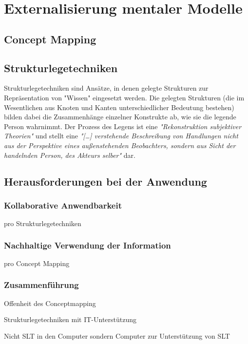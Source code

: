 \chapter{Externalisierung mentaler Modelle} %
\label{cha:externalisierung}



\section{Concept Mapping} %
\label{sec:concept_mapping}


\section{Strukturlegetechniken} %
\label{sec:strukturlegetechniken}

Strukturlegetechniken sind Ansätze, in denen gelegte Strukturen zur Repräsentation von "Wissen" eingesetzt werden. Die gelegten Strukturen (die im Wesentlichen aus Knoten und Kanten unterschiedlicher Bedeutung bestehen) bilden dabei die Zusammenhänge einzelner Konstrukte ab, wie sie die legende Person wahrnimmt. Der Prozess des Legens ist eine \emph{"Rekonstruktion subjektiver Theorien"} \citep{Dann92} und stellt eine \emph{"[\ldots] verstehende Beschreibung von Handlungen nicht aus der Perspektive eines außenstehenden Beobachters, sondern aus Sicht der handelnden Person, des Akteurs selber"} \citep{Dann92} dar. 


\section{Herausforderungen bei der Anwendung}
\label{sec:herausforderungen_bei_der_anwendung}

\subsection{Kollaborative Anwendbarkeit}

pro Strukturlegetechniken 

\subsection{Nachhaltige Verwendung der Information}

pro Concept Mapping

\subsection{Zusammenführung}

Offenheit des Conceptmapping

Strukturlegetechniken mit IT-Unterstützung

Nicht SLT in den Computer sondern Computer zur Unterstützung von SLT
